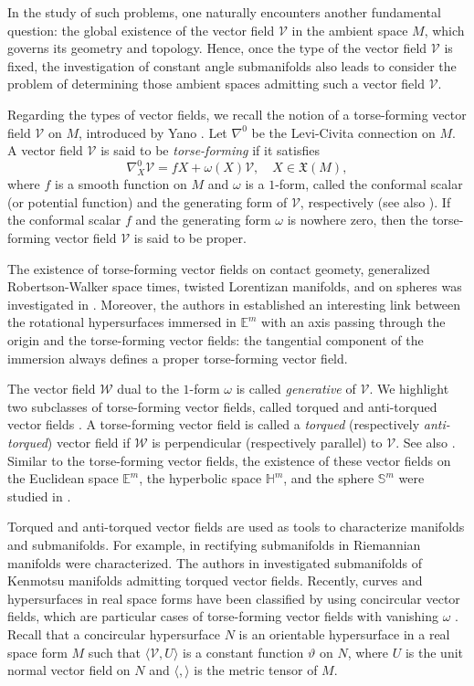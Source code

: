 \documentclass[12pt]{amsart}
\def\s{\mathbb S}
\def\h{\mathbb H}
\def\e{\mathbb E}
\def\v{\mathcal V}
\def\w{\mathcal W}
\theoremstyle{definition}
\begin{document}
In the study of such problems, one naturally encounters another fundamental question: the global existence of the vector field $\v$ in the ambient space $M$, which governs its geometry and topology. Hence, once the type of the vector field $\v$ is fixed, the investigation of constant angle submanifolds also leads to consider the problem of determining those ambient spaces admitting such a vector field $\v$. 

Regarding the types of vector fields, we recall the notion of a torse-forming vector field $\v$ on $M$, introduced by Yano \cite{ya1,ya0}. Let $\nabla^0$ be the Levi-Civita connection on $M$. A vector field $\v$ is said to be {\it torse-forming} if it satisfies
\begin{equation}\label{int-tor}
\nabla^0_X\v=fX+\omega(X) \v, \quad X\in \mathfrak{X}(M),
\end{equation}
where $f$ is a smooth function on $M$ and $\omega$ is a $1$-form, called the conformal scalar (or potential function) and the generating form of $\v$, respectively (see also \cite{bo1}). If the conformal scalar $f$ and the generating form $\omega$ is nowhere zero, then the torse-forming vector field $\v$ is said to be proper.

The existence of torse-forming vector fields on contact geomety, generalized Robertson-Walker space times, twisted Lorentizan manifolds, and on spheres was investigated in \cite{c0,id,mam0,mam1,mih0}. Moreover, the authors in \cite{c00} established an interesting link between the rotational hypersurfaces immersed in $\e^m$ with an axis passing through the origin and the torse-forming vector fields: the tangential component of the immersion always defines a proper torse-forming vector field.

The vector field $\w$ dual to the $1$-form $\omega$ is called {\it generative} of $\v$. We highlight two subclasses of torse-forming vector fields, called torqued and anti-torqued vector fields \cite{crs3,dan}. A torse-forming vector field is called a {\it torqued} (respectively {\it anti-torqued}) vector field if $\w$ is perpendicular (respectively parallel) to $\v$. See also \cite{cs,na}. Similar to the torse-forming vector fields, the existence of these vector fields on the Euclidean space $\e^m$, the hyperbolic space $\h^m$, and the sphere $\s^m$ were studied in \cite{amc,dan,dta}. 

Torqued and anti-torqued vector fields are used as tools to characterize manifolds and submanifolds. For example, in \cite{amc,crs3} rectifying submanifolds in Riemannian manifolds were characterized. The authors in \cite{ymy} investigated submanifolds of Kenmotsu manifolds admitting torqued vector fields. Recently, curves and hypersurfaces in real space forms have been classified by using concircular vector fields, which are particular cases of torse-forming vector fields with vanishing $\omega$ \cite{loy4,loy5}. Recall that a concircular hypersurface $N$ is an orientable hypersurface in a real space form $M$ such that $\langle \v,U\rangle$ is a constant function $\vartheta$ on $N$, where $U$ is the unit normal vector field on $N$ and $\langle ,\rangle$ is the metric tensor of $M$.  
\end{document}
